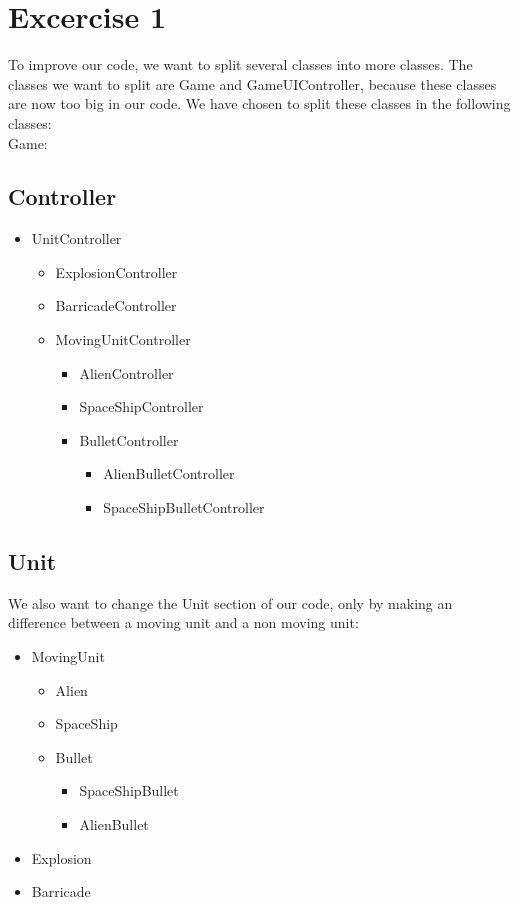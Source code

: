 \documentclass[10pt]{article}
\begin{document}
\section*{Excercise 1}
To improve our code, we want to split several classes into more classes. The classes we want to split are Game and GameUIController, because these classes are now too big in our code. We have chosen to split these classes in the following classes:\\
Game:\newline
\subsection*{Controller}
\begin{itemize}
\item UnitController
	\begin{itemize}
	\item ExplosionController
	\item BarricadeController	
	\item MovingUnitController
		\begin{itemize}
		\item AlienController
		\item SpaceShipController
		\item BulletController
			\begin{itemize}
			\item AlienBulletController
			\item SpaceShipBulletController
			\end{itemize}
		\end{itemize}
	\end{itemize}
\end{itemize}
\subsection*{Unit}
We also want to change the Unit section of our code, only by making an difference between a moving unit and a non moving unit:
	\begin{itemize}
	\item MovingUnit
		\begin{itemize}
		\item Alien
		\item SpaceShip
		\item Bullet
			\begin{itemize}
			\item SpaceShipBullet
			\item AlienBullet
			\end{itemize}
		\end{itemize}
	\item Explosion
	\item Barricade
	\end{itemize}
\end{document}
